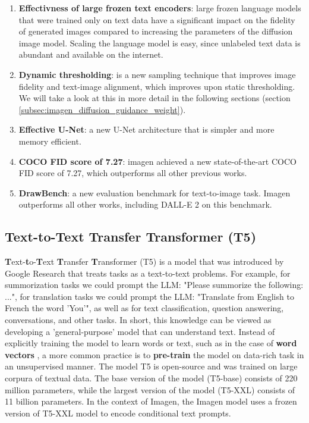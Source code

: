 \begin{enumerate}
    \item \textbf{Effectivness of large frozen text encoders}: large frozen language models that were trained only on text data have a significant impact on the fidelity of generated images compared to increasing the parameters of the diffusion image model. Scaling the language model is easy, since unlabeled text data is abundant and available on the internet.
    \item \textbf{Dynamic thresholding}: is a new sampling technique that improves image fidelity and text-image alignment, which improves upon static thresholding. We will take a look at this in more detail in the following sections (section \ref{subsec:imagen_diffusion_guidance_weight}).
    \item \textbf{Effective U-Net}: a new U-Net architecture that is simpler and more memory efficient.
    \item \textbf{COCO FID score of 7.27}: imagen achieved a new state-of-the-art COCO FID score of 7.27, which outperforms all other previous works.
    \item \textbf{DrawBench}: a new evaluation benchmark for text-to-image task. Imagen outperforms all other works, including DALL-E 2 \cite{dalle_2} on this benchmark.
\end{enumerate}



















\subsection{Text-to-Text Transfer Transformer (T5)}

\textbf{T}ext-\textbf{t}o-\textbf{T}ext \textbf{T}ransfer \textbf{T}ransformer (T5) \cite{t5_model} is a model that was introduced by Google Research that treats tasks as a text-to-text problems. For example, for summorization tasks we could prompt the LLM: "Please summorize the following: ...", for translation tasks we could prompt the LLM: "Translate from English to French the word 'You'", as well as for text classification, question answering, conversations, and other tasks. In short, this knowledge can be viewed as developing a 'general-purpose' model that can understand text.  Instead of explicitly training the model to learn words or text, such as in the case of \textbf{word vectors} \cite{cbow_word2vec}, a more common practice is to \textbf{pre-train} \cite{bert} the model on data-rich task in an unsupervised manner. The model T5 is open-source and was trained on large corpura of textual data. The base version of the model (T5-base) consists of 220 million parameters, while the largest version of the model (T5-XXL) consists of 11 billion parameters. In the context of Imagen, the Imagen model uses a frozen version of T5-XXL model to encode conditional text prompts.

